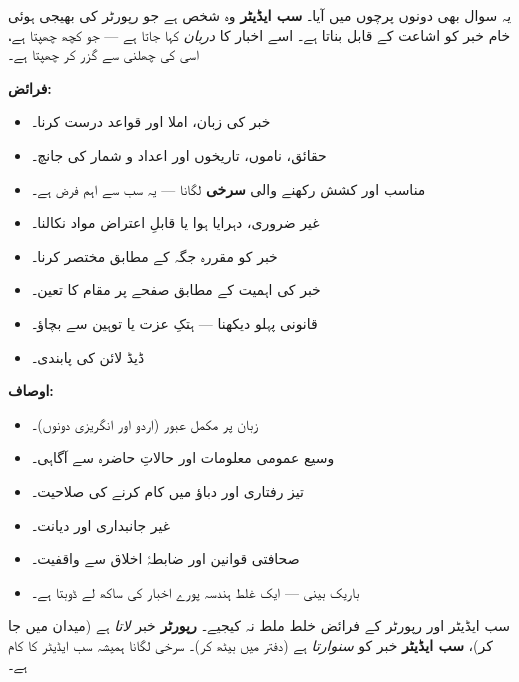 \begin{hal}
یہ سوال بھی دونوں پرچوں میں آیا۔ \textbf{سب ایڈیٹر} وہ شخص ہے جو رپورٹر کی
بھیجی ہوئی خام خبر کو اشاعت کے قابل بناتا ہے۔ اسے اخبار کا \emph{دربان}
کہا جاتا ہے --- جو کچھ چھپتا ہے، اسی کی چھلنی سے گزر کر چھپتا ہے۔

\medskip
\textbf{فرائض:}
\begin{itemize}\setlength{\itemsep}{1pt}
  \item خبر کی زبان، املا اور قواعد درست کرنا۔
  \item حقائق، ناموں، تاریخوں اور اعداد و شمار کی جانچ۔
  \item مناسب اور کشش رکھنے والی \textbf{سرخی} لگانا --- یہ سب سے اہم فرض ہے۔
  \item غیر ضروری، دہرایا ہوا یا قابلِ اعتراض مواد نکالنا۔
  \item خبر کو مقررہ جگہ کے مطابق مختصر کرنا۔
  \item خبر کی اہمیت کے مطابق صفحے پر مقام کا تعین۔
  \item قانونی پہلو دیکھنا --- ہتکِ عزت یا توہین سے بچاؤ۔
  \item ڈیڈ لائن کی پابندی۔
\end{itemize}

\textbf{اوصاف:}
\begin{itemize}\setlength{\itemsep}{1pt}
  \item زبان پر مکمل عبور (اردو اور انگریزی دونوں)۔
  \item وسیع عمومی معلومات اور حالاتِ حاضرہ سے آگاہی۔
  \item تیز رفتاری اور دباؤ میں کام کرنے کی صلاحیت۔
  \item غیر جانبداری اور دیانت۔
  \item صحافتی قوانین اور ضابطۂ اخلاق سے واقفیت۔
  \item باریک بینی --- ایک غلط ہندسہ پورے اخبار کی ساکھ لے ڈوبتا ہے۔
\end{itemize}

\end{hal}

\begin{ghalti}
سب ایڈیٹر اور رپورٹر کے فرائض خلط ملط نہ کیجیے۔ \textbf{رپورٹر} خبر
\emph{لاتا} ہے (میدان میں جا کر)، \textbf{سب ایڈیٹر} خبر کو \emph{سنوارتا} ہے
(دفتر میں بیٹھ کر)۔ سرخی لگانا ہمیشہ سب ایڈیٹر کا کام ہے۔
\end{ghalti}

